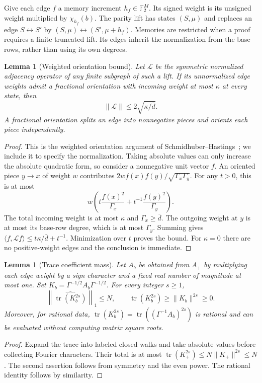 \documentclass[letterpaper,11pt]{article}
\newtheorem{lemma}[theorem]{Lemma}
\theoremstyle{definition}
\newcommand{\F}{\mathbb F}
\DeclareMathOperator{\tr}{tr}
\begin{document}
Give each edge $f$ a memory increment $h_f\in\F_2^M$.
Its signed weight is its unsigned weight multiplied by
$\chi_{h_f}(b)$. The parity lift has states $(S,\mu)$ and replaces
an edge $S\leftrightarrow S'$ by
$(S,\mu)\leftrightarrow(S',\mu+h_f)$. Memories are restricted
when a proof requires a finite truncated lift. Its edges inherit the
normalization from the base rows, rather than using its own degrees.

\begin{lemma}[Weighted orientation bound]
\label{lem:orientation}
Let $\mathcal L$ be the symmetric normalized adjacency operator of
any finite subgraph of such a lift. If its unnormalized edge weights
admit a fractional orientation with incoming weight at most $\kappa$
at every state, then
\begin{equation}
 \|\mathcal L\|\le2\sqrt{\kappa/\bar d}.
 \label{eq:orientation}
\end{equation}
A fractional orientation splits an edge into nonnegative pieces and
orients each piece independently.
\end{lemma}
\begin{proof}
This is the weighted orientation argument of
Schmidhuber--Hastings~\cite[Lemma~2.5]{SH26Moore}; we include it to
specify the normalization. Taking absolute values can only increase
the absolute quadratic form, so consider a nonnegative unit vector
$f$. An oriented piece $y\to x$ of weight $w$ contributes
$2wf(x)f(y)/\sqrt{\Gamma_x\Gamma_y}$. For any $t>0$, this is at most
\[
 w\left(t\frac{f(x)^2}{\Gamma_x}
         +t^{-1}\frac{f(y)^2}{\Gamma_y}\right).
\]
The total incoming weight is at most $\kappa$ and
$\Gamma_x\ge\bar d$. The outgoing weight at $y$ is at most its
base-row degree, which is at most $\Gamma_y$. Summing gives
$\langle f,\mathcal Lf\rangle\le t\kappa/\bar d+t^{-1}$.
Minimization over $t$ proves the bound. For $\kappa=0$ there are
no positive-weight edges and the conclusion is immediate.
\end{proof}

\begin{lemma}[Trace coefficient mass]
\label{lem:trace-mass}
Let $A_b$ be obtained from $A_+$ by multiplying each edge weight by
a sign character and a fixed real number of magnitude at most one.
Set $K_b=\Gamma^{-1/2}A_b\Gamma^{-1/2}$. For every integer $s\ge1$,
\begin{equation}
 \left\|\widehat{\tr(K_b^{2s})}\right\|_1\le N,
 \qquad
 \tr(K_b^{2s})\ge\|K_b\|^{2s}\ge0.
 \label{eq:trace-mass}
\end{equation}
Moreover, for rational data,
$\tr(K_b^{2s})=\tr((\Gamma^{-1}A_b)^{2s})$ is rational and can
be evaluated without computing matrix square roots.
\end{lemma}
\begin{proof}
Expand the trace into labeled closed walks and take absolute values
before collecting Fourier characters. Their total is at most
$\tr(K_+^{2s})\le N\|K_+\|^{2s}\le N$.
The second assertion follows from symmetry and the even power.
The rational identity follows by similarity.
\end{proof}
\end{document}
